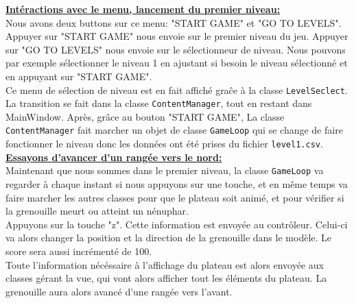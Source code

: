 \documentclass[a4paper, 12pt]{article}
\begin{document}
\underline{\textbf{Intéractions avec le menu, lancement du premier niveau:}} \vspace{0.2cm} \\
Nous avons deux buttons sur ce menu: "START GAME" et "GO TO LEVELS". 
Appuyer sur "START GAME" nous envoie sur le premier niveau du jeu.
Appuyer sur "GO TO LEVELS" nous envoie sur le sélectionneur de niveau.
Nous pouvons par exemple sélectionner le niveau 1 en ajustant si besoin le 
niveau sélectionné et en appuyant sur "START GAME". \\
Ce menu de sélection de niveau est en fait affiché graĉe à la classe 
\texttt{LevelSeclect}.
La transition se fait dans la classe \texttt{ContentManager}, 
tout en restant dans MainWindow.
Après, grâce au bouton "START GAME",
La classe \texttt{ContentManager} fait marcher un objet de classe \texttt{GameLoop}
qui se change de faire fonctionner le niveau donc les données ont été prises du
fichier \texttt{level1.csv}. \\

\underline{\textbf{Essayons d'avancer d'un rangée vers le nord:}} \vspace{0.2cm} \\
Maintenant que nous sommes dans le premier niveau, la classe \texttt{GameLoop} va 
regarder à chaque instant si nous appuyons sur une touche, et en même temps va
faire marcher les autres classes pour que le plateau soit animé, et 
pour vérifier si la grenouille meurt ou atteint un nénuphar. \\
Appuyons sur la touche "z". Cette information est envoyée au contrôleur.
Celui-ci va alors changer la position et la direction de la grenouille dans le modèle.
Le score sera aussi incrémenté de 100. \\
Toute l'information nécéssaire à l'affichage du plateau est alors envoyée aux classes
gérant la vue, qui vont alors afficher tout les éléments du plateau. La grenouille aura
alors avancé d'une rangée vers l'avant. 
\end{document}
